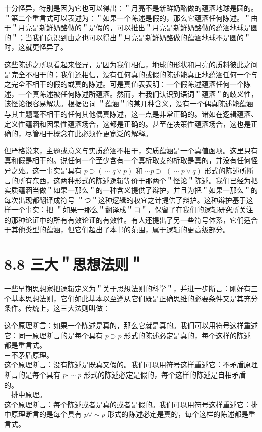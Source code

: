 十分怪异，特别是因为它也可以得出：＂月亮不是新鲜奶酪做的蕴涵地球是圆的。＂第二个重言式可以表述为：＂如果一个陈述是假的，那么它蕴涵任何陈述。＂由于＂月亮是新鲜奶酪做的＂是假的，可以推出＂月亮是新鲜奶酪做的蕴涵地球是圆的＂；当我们意识到由之也可以得出＂月亮是新鲜奶酪做的蕴涵地球不是圆的＂时，这就更怪异了。

这些陈述之所以看起来怪异，是因为我们相信，地球的形状和月亮的质料彼此之间是完全不相干的；我们还相信，没有任何真的或假的陈述能真正地蕴涵任何一个与之完全不相干的假的或真的陈述。可是真值表表明：一个假陈述蕴涵任何一个陈述，一个真陈述被任何陈述所蕴涵。然而，若我们认识到语词＂蕴涵＂的歧义性，该怪论很容易解决。根据语词 ＂蕴涵＂的某几种含义，没有一个偶真陈述能蕴涵与其主题毫不相干的任何其他偶真陈述，这一点是非常正确的。诸如在逻辑蕴涵、定义性蕴涵和因果性蕴涵场合，这都是正确的。甚至在决策性蕴涵场合，这也是正确的，尽管相干概念在此必须作更宽泛的解释。

但严格说来，主题或意义与实质蕴涵不相干，实质蕴涵是一个真值函项。这里只有真和假是相干的。说任何一个至少含有一个真析取支的析取是真的，并没有任何怪异之处。这一事实是具有 $p \supset(\sim q \vee p)$ 和 $\sim p \supset$ $(\sim p \vee q)$ 形式的陈述所断言的所有东西，这两种形式的陈述逻辑等价于那两个＂怪论＂陈述。我们已经为把实质蕴涵当做＂如果一那么＂的一种含义提供了辩护，并且为把＂如果一那么＂的每次出现都翻译成符号 ＂つ＂这种逻辑的权宜之计提供了辩护。这种辩护基于这样一个事实：把 ＂如果一那么＂翻译成＂コ＂，保留了在我们的逻辑研究所关注的那种论证中的所有有效论证的有效性。有人还提出了另一些符号体系，它们适合于其他类型的蕴涵，但它们超出了本书的范围，属于逻辑的更高级部分。

\section*{8.8 三大＂思想法则＂}
一些早期思想家把逻辑定义为＂关于思想法则的科学＂，并进一步断言：刚好有三个基本思想法则，它们如此基本以至遵从它们既是正确思维的必要条件又是其充分条件。传统上，这三大法则叫做：

这个原理断言：如果一个陈述是真的，那么它就是真的。我们可以用符号这样重述它：同一原理断言的是每个具有 $p \supset p$ 形式的陈述必定是真的，每个这样的陈述都是重言式。\\
－不矛盾原理。\\
这个原理断言：没有陈述是既真又假的。我们可以用符号这样重述它：不矛盾原理断言的是每个具有 $p \cdot \sim p$ 形式的陈述必定是假的，每个这样的陈述是自相矛盾的。\\
－排中原理。\\
这个原理断言：每个陈述或者是真的或者是假的。我们可以用符号这样重述它：排中原理断言的是每个具有 $p \vee \sim p$ 形式的陈述必定是真的，每个这样的陈述都是重言式。

